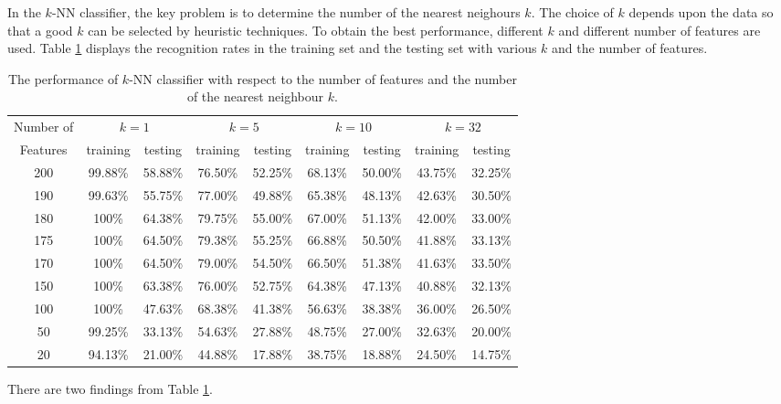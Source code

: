 In the $k$-NN classifier, the key problem is to determine the number of the nearest neighours $k$. The choice of $k$ depends upon the data so that a good $k$ can be selected by heuristic techniques. To obtain the best performance, different $k$ and different number of features are used. \mbox{Table} \ref{tab:knnperformance} displays the recognition rates in the training set and the testing set with various $k$ and the number of features.
\begin{table}[ht]
\begin{center}
\caption{The performance of $k$-NN classifier with respect to the number of features and the number of the nearest neighbour $k$.}
 \begin{tabular}{|c|c|c|c|c|c|c|c|c|}
  \hline
   \small{Number of}  & \multicolumn{2}{c|}{\small{$k=1$}} & \multicolumn{2}{c|}{\small{$k=5$}} & \multicolumn{2}{c|}{\small{$k=10$}} & \multicolumn{2}{c|}{\small{$k=32$}}\\
  \cline{2-9}
  \small{Features} & \small{training} & \small{testing} & \small{training} & \small{testing} & \small{training} & \small{testing} & \small{training} & \small{testing} \\
  \hline
  \small{200} & \small{99.88\%} & \small{58.88\%} & \small{76.50\%} & \small{52.25\%} & \small{68.13\%} & \small{50.00\%} & \small{43.75\%} & \small{32.25\%} \\
  \small{190} & \small{99.63\%} & \small{55.75\%} & \small{77.00\%} & \small{49.88\%} & \small{65.38\%} & \small{48.13\%} & \small{42.63\%} & \small{30.50\%} \\
  \small{180} & \small{100\%}    & \small{64.38\%} & \small{79.75\%} & \small{55.00\%} & \small{67.00\%} & \small{51.13\%} & \small{42.00\%} & \small{33.00\%} \\
  \small{175} & \small{100\%}    & \small{64.50\%} & \small{79.38\%} & \small{55.25\%} & \small{66.88\%} & \small{50.50\%} & \small{41.88\%} & \small{33.13\%} \\
  \small{170} & \small{100\%}    & \small{64.50\%} & \small{79.00\%} & \small{54.50\%} & \small{66.50\%} & \small{51.38\%} & \small{41.63\%} & \small{33.50\%} \\
  \small{150} & \small{100\%}    & \small{63.38\%} & \small{76.00\%} & \small{52.75\%} & \small{64.38\%} & \small{47.13\%} & \small{40.88\%} & \small{32.13\%} \\
  \small{100} & \small{100\%}    & \small{47.63\%} & \small{68.38\%} & \small{41.38\%} & \small{56.63\%} & \small{38.38\%} & \small{36.00\%} & \small{26.50\%} \\
   \small{50} & \small{99.25\%}  & \small{33.13\%} & \small{54.63\%} & \small{27.88\%} & \small{48.75\%} & \small{27.00\%} & \small{32.63\%} & \small{20.00\%} \\
   \small{20} & \small{94.13\%}  & \small{21.00\%} & \small{44.88\%} & \small{17.88\%} & \small{38.75\%} & \small{18.88\%} & \small{24.50\%} & \small{14.75\%} \\
\hline
 \end{tabular}
\label{tab:knnperformance}
\end{center}
\end{table} 
There are two findings from \mbox{Table} \ref{tab:knnperformance}.

